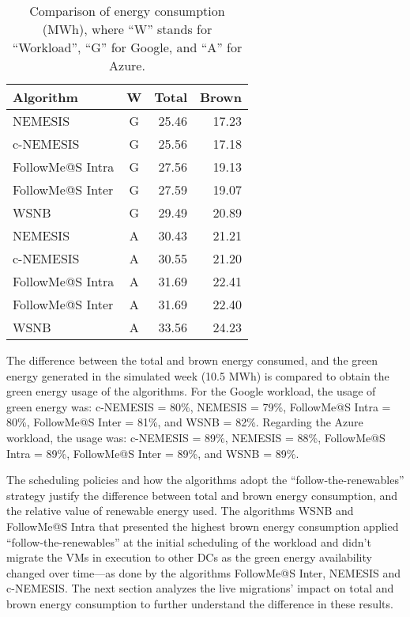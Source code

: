 \begin{table}[h]
\caption{Comparison of energy consumption (MWh), where ``W'' stands for ``Workload'', ``G'' for Google, and ``A'' for Azure.}\label{tab:total_energy_cons} \centering
\begin{tabular}{|l|c|r|r|}
  \hline
  \textbf{Algorithm} & \textbf{W} & \textbf{Total} &  \textbf{Brown} \\
  \hline  
  NEMESIS  & G & 25.46 & 17.23 \\
  \hline
  c-NEMESIS & G & 25.56 & 17.18 \\
  \hline
  FollowMe@S Intra  & G & 27.56 & 19.13 \\
  \hline
  FollowMe@S Inter  & G & 27.59 & 19.07 \\
  \hline
  WSNB  & G & 29.49 & 20.89 \\
  \hline
  NEMESIS  & A  & 30.43 & 21.21 \\
  \hline
  c-NEMESIS & A  & 30.55 & 21.20 \\
  \hline
  FollowMe@S Intra  & A  & 31.69 & 22.41 \\
  \hline
  FollowMe@S Inter  & A  & 31.69 & 22.40 \\
  \hline
  WSNB & A   & 33.56 & 24.23 \\
  \hline
\end{tabular}
\end{table}


The difference between the total and brown energy consumed, and the green energy generated in the simulated week (10.5 MWh) is compared to obtain the green energy usage of the algorithms. For the Google workload, the usage of green energy was: c-NEMESIS = 80\%, NEMESIS = 79\%, FollowMe@S Intra = 80\%, FollowMe@S Inter = 81\%, and WSNB = 82\%. Regarding the Azure workload, the usage was: c-NEMESIS = 89\%, NEMESIS = 88\%, FollowMe@S Intra = 89\%, FollowMe@S Inter = 89\%, and WSNB = 89\%. 


The scheduling policies and how the algorithms adopt the ``follow-the-renewables'' strategy justify the difference between total and brown energy consumption, and the relative value of renewable energy used. The algorithms WSNB and FollowMe@S Intra that presented the highest brown energy consumption applied ``follow-the-renewables'' at the initial scheduling of the workload and didn't migrate the VMs in execution to other DCs as the green energy availability changed over time---as done by the algorithms FollowMe@S Inter, NEMESIS and c-NEMESIS. The next section analyzes the live migrations' impact on total and brown energy consumption to further understand the difference in these results.


